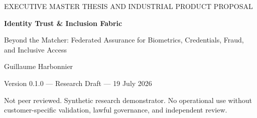 \documentclass[11pt,oneside]{book}
\begin{document}
\begin{titlepage}
\pagecolor{TrustNavy}
\color{white}
\vspace*{18mm}
{\Large EXECUTIVE MASTER THESIS AND INDUSTRIAL PRODUCT PROPOSAL\par}
\vspace{15mm}
{\Huge\bfseries Identity Trust \& Inclusion Fabric\par}
\vspace{5mm}
{\LARGE Beyond the Matcher: Federated Assurance for Biometrics, Credentials, Fraud, and Inclusive Access\par}
\vfill
{}
\vfill
{\Large Guillaume Harbonnier\par}
{\large Version 0.1.0 --- Research Draft --- 19 July 2026\par}
\vspace{8mm}
{\small Not peer reviewed. Synthetic research demonstrator. No operational use without customer-specific validation, lawful governance, and independent review.\par}
\end{titlepage}
\nopagecolor
\color{black}

\frontmatter

\tableofcontents
\listoffigures
\listoftables

\mainmatter











\appendix




\backmatter


\end{document}
